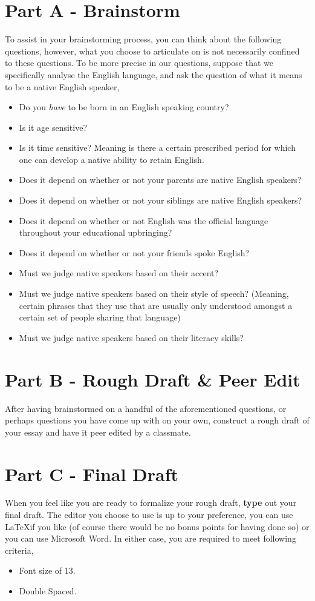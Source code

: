 \documentclass[12pt]{article} %
\begin{document}
  \section{Part A - Brainstorm}
  To assist in your brainstorming process, you can think about the following questions, however, what you choose to
  articulate on is not necessarily confined to these questions. To be more precise in our questions, suppose
  that we specifically analyse the English language, and ask the question of what it means to be a 
  native English speaker, 
  \begin{itemize}
    \item Do you \textit{have} to be born in an English speaking country?
    \item Is it age sensitive?
    \item Is it time sensitive? Meaning is there a certain prescribed period for which one can develop a native
      ability to retain English.
    \item Does it depend on whether or not your parents are native English speakers?
    \item Does it depend on whether or not your siblings are native English speakers?
    \item Does it depend on whether or not English was the official language throughout your educational upbringing?
    \item Does it depend on whether or not your friends spoke English?
    \item Must we judge native speakers based on their accent?
    \item Must we judge native speakers based on their style of speech? (Meaning, certain phrases that they use
      that are usually only understood amongst a certain set of people sharing that language)
    \item Must we judge native speakers based on their literacy skills?
  \end{itemize}

  \newpage

  \section{Part B - Rough Draft \& Peer Edit}
  After having brainstormed on a handful of the aforementioned questions, or perhaps questions you have come up with on
  your own, construct a rough draft of your essay and have it peer edited by a classmate.

  \section{Part C - Final Draft}
  When you feel like you are ready to formalize your rough draft, \textbf{type} out your final draft. The editor
  you choose to use is up to your preference, you can use \LaTeX if you like (of course there would be no
  bonus points for having done so) or you can use Microsoft Word. In either case, you are required to meet
  following criteria,
  \begin{itemize}
    \item Font size of 13.
    \item Double Spaced.
  \end{itemize}
\end{document}

